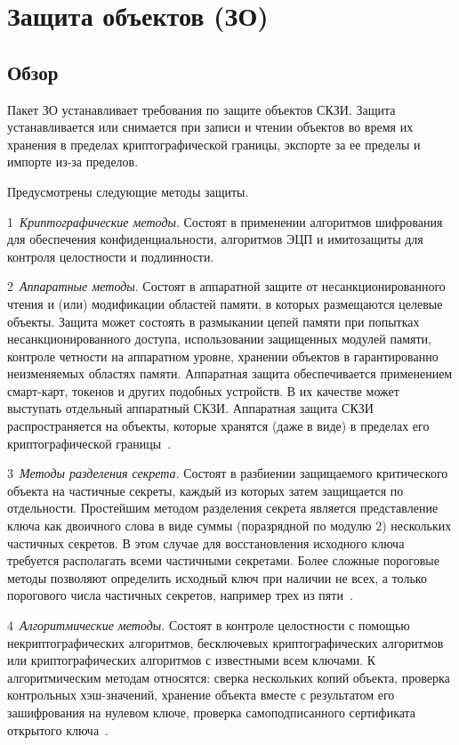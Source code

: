 \section{Защита объектов (ЗО)}\label{DP}

\subsection{Обзор}\label{DP.Defs}

Пакет ЗО устанавливает требования по защите объектов СКЗИ. 
Защита устанавливается или снимается при записи и чтении объектов 
во время их хранения в пределах криптографической границы, экспорте за ее 
пределы и импорте из-за пределов. 

Предусмотрены следующие методы защиты.

1~{\it Криптографические методы}. 
Состоят в применении алгоритмов шифрования для обеспечения конфиденциальности, 
алгоритмов ЭЦП и имитозащиты для контроля целостности и подлинности.

2~{\it Аппаратные методы}. 
Состоят в аппаратной защите от несанкционированного чтения и (или) модификации
областей памяти, в которых размещаются целевые объекты. 
%
Защита может состоять в размыкании цепей памяти при попытках 
несанкционированного доступа, использовании защищенных модулей памяти, 
контроле четности на аппаратном уровне, хранении объектов в гарантированно 
неизменяемых областях памяти.
%
Аппаратная защита обеспечивается применением смарт-карт, токенов и других
подобных устройств. В их качестве может выступать отдельный аппаратный СКЗИ.
%
Аппаратная защита СКЗИ распространяется на объекты, которые хранятся 
(даже в  виде) в пределах его криптографической 
границы~.

3~{\it Методы разделения секрета}. 
Состоят в разбиении защищаемого критического объекта на частичные секреты, 
каждый из которых затем защищается по отдельности.
%
Простейшим методом разделения секрета является представление
ключа как двоичного слова в виде суммы (поразрядной по модулю $2$)
нескольких частичных секретов. 
В этом случае для восстановления исходного 
ключа требуется располагать всеми частичными секретами.
%
Более сложные пороговые методы позволяют 
определить исходный ключ при наличии не всех, 
а только порогового числа частичных секретов, 
например трех из пяти~.

4~{\it Алгоритмические методы}. 
Состоят в контроле целостности с помощью некриптографических
алгоритмов, бесключевых криптографических алгоритмов
или криптографических алгоритмов с известными всем ключами.
%
К алгоритмическим методам относятся: 
сверка нескольких копий объекта, 
проверка контрольных хэш-значений,
хранение объекта вместе с результатом его зашифрования на нулевом ключе,
проверка самоподписанного сертификата открытого ключа~.

